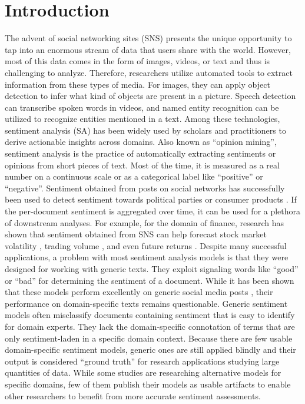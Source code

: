 \section{Introduction}

The advent of social networking sites (SNS) presents the unique opportunity to tap into an enormous stream of data that users share with the world. However, most of this data comes in the form of images, videos, or text and thus is challenging to analyze. Therefore, researchers utilize automated tools to extract information from these types of media. For images, they can apply object detection to infer what kind of objects are present in a picture. Speech detection can transcribe spoken words in videos, and named entity recognition can be utilized to recognize entities mentioned in a text. Among these technologies, sentiment analysis (SA) has been widely used by scholars and practitioners to derive actionable insights across domains. Also known as ``opinion mining'', sentiment analysis is the practice of automatically extracting sentiments or opinions from short pieces of text. Most of the time, it is measured as a real number on a continuous scale or as a categorical label like ``positive'' or ``negative''. Sentiment obtained from posts on social networks has successfully been used to detect sentiment towards political parties  or consumer products \cite{pontiki2016semeval}. If the per-document sentiment is aggregated over time, it can be used for a plethora of downstream analyses. For example, for the domain of finance, research has shown that sentiment obtained from SNS can help forecast stock market volatility , trading volume , and even future returns .\newline
Despite many successful applications, a problem with most sentiment analysis models is that they were designed for working with generic texts. They exploit signaling words like ``good'' or ``bad'' for determining the sentiment of a document. While it has been shown that these models perform excellently on generic social media posts \cite{al2020evaluating}, their performance on domain-specific texts remains questionable. Generic sentiment models often misclassify documents containing sentiment that is easy to identify for domain experts. They lack the domain-specific connotation of terms that are only sentiment-laden in a specific domain context. Because there are few usable domain-specific sentiment models, generic ones are still applied blindly and their output is considered ``ground truth'' for research applications studying large quantities of data. While some studies are researching alternative models for specific domains, few of them publish their models as usable artifacts to enable other researchers to benefit from more accurate sentiment assessments.

